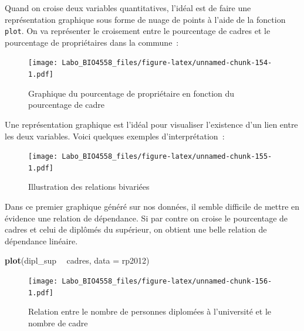 \documentclass[12pt,]{book}
\newenvironment{Shaded}{\begin{snugshade}}{\end{snugshade}}
\newcommand{\DataTypeTok}[1]{\textcolor[rgb]{0.13,0.29,0.53}{#1}}
\newcommand{\KeywordTok}[1]{\textcolor[rgb]{0.13,0.29,0.53}{\textbf{#1}}}
\newcommand{\NormalTok}[1]{#1}
\newcommand{\OperatorTok}[1]{\textcolor[rgb]{0.81,0.36,0.00}{\textbf{#1}}}
\newcommand{\StringTok}[1]{\textcolor[rgb]{0.31,0.60,0.02}{#1}}
\begin{document}
Quand on croise deux variables quantitatives, l'idéal est de faire une représentation graphique sous forme de nuage de points à l'aide de la fonction \texttt{plot}. On va représenter le croisement entre le pourcentage de cadres et le pourcentage de propriétaires dans la commune~:

\begin{Shaded}
\end{Shaded}

\begin{figure}
\centering
\texttt{[image: Labo\_BIO4558\_files/figure-latex/unnamed-chunk-154-1.pdf]}
\caption{\label{fig:unnamed-chunk-154}Graphique du pourcentage de propriétaire en fonction du pourcentage de cadre}
\end{figure}

Une représentation graphique est l'idéal pour visualiser l'existence d'un lien entre les deux variables. Voici quelques exemples d'interprétation~:

\begin{figure}
\centering
\texttt{[image: Labo\_BIO4558\_files/figure-latex/unnamed-chunk-155-1.pdf]}
\caption{\label{fig:unnamed-chunk-155}Illustration des relations bivariées}
\end{figure}

Dans ce premier graphique généré sur nos données, il semble difficile de mettre en évidence une relation de dépendance. Si par contre on croise le pourcentage de cadres et celui de diplômés du supérieur, on obtient une belle relation de dépendance linéaire.

\begin{Shaded}
\begin{Highlighting}[]
\KeywordTok{plot}\NormalTok{(dipl_sup }\OperatorTok{~}\StringTok{ }\NormalTok{cadres, }\DataTypeTok{data =}\NormalTok{ rp2012)}
\end{Highlighting}
\end{Shaded}

\begin{figure}
\centering
\texttt{[image: Labo\_BIO4558\_files/figure-latex/unnamed-chunk-156-1.pdf]}
\caption{\label{fig:unnamed-chunk-156}Relation entre le nombre de personnes diplomées à l'université et le nombre de cadre}
\end{figure}
\end{document}
